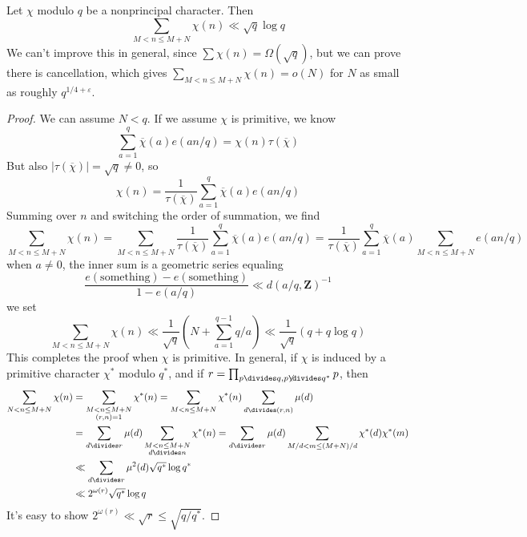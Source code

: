 \begin{theorem}
    Let $\chi$ modulo $q$ be a nonprincipal character. Then
    \[ \sum_{M < n \leq M+N} \chi(n) \ll \sqrt{q} \log q \]
    We can't improve this in general, since $\sum \chi(n) = \Omega(\sqrt{q})$, but we can prove there is cancellation, which gives $\sum_{M < n \leq M+N} \chi(n) = o(N)$ for $N$ as small as roughly $q^{1/4 + \varepsilon}$.
\end{theorem}
\begin{proof}
    We can assume $N < q$. If we assume $\chi$ is primitive, we know
    \[ \sum_{a = 1}^q \overline{\chi}(a) e(an/q) = \chi(n) \tau(\overline{\chi}) \]
    But also $|\tau(\overline{\chi})| = \sqrt{q} \neq 0$, so
    \[ \chi(n) = \frac{1}{\tau(\overline{\chi})} \sum_{a = 1}^q \overline{\chi}(a) e(an/q) \]
    Summing over $n$ and switching the order of summation, we find
    \[ \sum_{M < n \leq M + N} \chi(n) = \sum_{M < n \leq M + N} \frac{1}{\tau(\overline{\chi})} \sum_{a = 1}^q \overline{\chi}(a) e(an/q) = \frac{1}{\tau(\overline{\chi})} \sum_{a = 1}^q \overline{\chi}(a) \sum_{M < n \leq M + N} e(an/q) \]
%
when $a \neq 0$, the inner sum is a geometric series equaling
%
\[  \frac{e(\text{something}) - e(\text{something})}{1 - e(a/q)} \ll d(a/q, \mathbf{Z})^{-1} \]
%
we set
%
\[ \sum_{M < n \leq M + N} \chi(n) \ll \frac{1}{\sqrt{q}} \left( N + \sum_{a = 1}^{q-1} q/a \right) \ll \frac{1}{\sqrt{q}} \left( q + q \log q \right) \]
%
This completes the proof when $\chi$ is primitive. In general, if $\chi$ is induced by a primitive character $\chi^*$ modulo $q^*$, and if $r = \prod_{p \divides q, p \not \divides q^*} p$, then
%
\begin{align*}
    \sum_{N < n \leq M + N} \chi(n) &= \sum_{\substack{M < n \leq M + N\\(r,n) = 1}} \chi^*(n) = \sum_{M < n \leq M+N} \chi^*(n) \sum_{d \divides (r,n)} \mu(d)\\
    &= \sum_{d \divides r} \mu(d) \sum_{\substack{M < n \leq M + N\\d \divides n}} \chi^*(n) = \sum_{d \divides r} \mu(d) \sum_{M/d < m \leq (M+N)/d} \chi^*(d) \chi^*(m)\\
    &\ll \sum_{d \divides r} \mu^2(d) \sqrt{q^*} \log q^*\\
    &\ll 2^{\omega(r)} \sqrt{q^*} \log q
\end{align*}
%
It's easy to show $2^{\omega(r)} \ll \sqrt{r} \leq \sqrt{q/q^*}$.
\end{proof}

